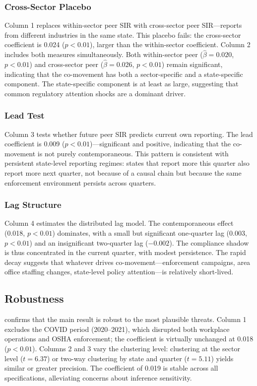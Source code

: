 \documentclass[12pt]{article}
\begin{document}
\subsubsection*{Cross-Sector Placebo} Column 1 replaces within-sector peer SIR with cross-sector peer SIR---reports from different industries in the same state. This placebo fails: the cross-sector coefficient is 0.024 ($p < 0.01$), larger than the within-sector coefficient. Column 2 includes both measures simultaneously. Both within-sector peer ($\hat{\beta} = 0.020$, $p < 0.01$) and cross-sector peer ($\hat{\beta} = 0.026$, $p < 0.01$) remain significant, indicating that the co-movement has both a sector-specific and a state-specific component. The state-specific component is at least as large, suggesting that common regulatory attention shocks are a dominant driver.

\subsubsection*{Lead Test} Column 3 tests whether future peer SIR predicts current own reporting. The lead coefficient is 0.009 ($p < 0.01$)---significant and positive, indicating that the co-movement is not purely contemporaneous. This pattern is consistent with persistent state-level reporting regimes: states that report more this quarter also report more next quarter, not because of a causal chain but because the same enforcement environment persists across quarters.

\subsubsection*{Lag Structure} Column 4 estimates the distributed lag model. The contemporaneous effect (0.018, $p < 0.01$) dominates, with a small but significant one-quarter lag (0.003, $p < 0.01$) and an insignificant two-quarter lag ($-0.002$). The compliance shadow is thus concentrated in the current quarter, with modest persistence. The rapid decay suggests that whatever drives co-movement---enforcement campaigns, area office staffing changes, state-level policy attention---is relatively short-lived.



\subsection{Robustness}

 confirms that the main result is robust to the most plausible threats. Column 1 excludes the COVID period (2020--2021), which disrupted both workplace operations and OSHA enforcement; the coefficient is virtually unchanged at 0.018 ($p < 0.01$). Columns 2 and 3 vary the clustering level: clustering at the sector level ($t = 6.37$) or two-way clustering by state and quarter ($t = 5.11$) yields similar or greater precision. The coefficient of 0.019 is stable across all specifications, alleviating concerns about inference sensitivity.
\end{document}
